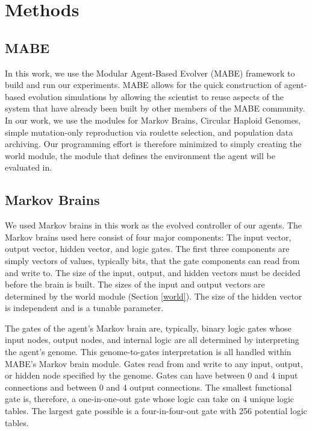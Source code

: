 \section{Methods}

\subsection{MABE}\label{mabe}

In this work, we use the Modular Agent-Based Evolver\cite{bohm_mabe_2017} (MABE) framework to build and run our experiments. MABE allows for the quick construction of agent-based evolution simulations by allowing the scientist to reuse aspects of the system that have already been built by other members of the MABE community. In our work, we use the modules for Markov Brains, Circular Haploid Genomes, simple mutation-only reproduction via roulette selection, and population data archiving. Our programming effort is therefore minimized to simply creating the world module, the module that defines the environment the agent will be evaluated in.

\subsection*{Markov Brains}

We used Markov brains in this work as the evolved controller of our agents. The Markov brains used here consist of four major components: The input vector, output vector, hidden vector, and logic gates. The first three components are simply vectors of values, typically bits, that the gate components can read from and write to. The size of the input, output, and hidden vectors must be decided before the brain is built. The sizes of the input and output vectors are determined by the world module (Section \ref{world}). The size of the hidden vector is independent and is a tunable parameter.

The gates of the agent's Markov brain are, typically, binary logic gates whose input nodes, output nodes, and internal logic are all determined by interpreting the agent's genome. This genome-to-gates interpretation is all handled within MABE's Markov brain module. Gates read from and write to any input, output, or hidden node specified by the genome. Gates can have between 0 and 4 input connections and between 0 and 4 output connections. The smallest functional gate is, therefore, a one-in-one-out gate whose logic can take on 4 unique logic tables. The largest gate possible is a four-in-four-out gate with 256 potential logic tables.

